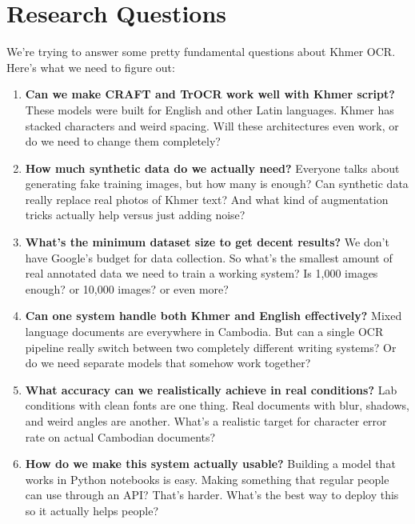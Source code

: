 \section{Research Questions}
\label{sec:questions}

We're trying to answer some pretty fundamental questions about Khmer OCR. Here's what we need to figure out:

\begin{enumerate}
    \item \textbf{Can we make CRAFT and TrOCR work well with Khmer script?} These models were built for English and other Latin languages. Khmer has stacked characters and weird spacing. Will these architectures even work, or do we need to change them completely?

    \item \textbf{How much synthetic data do we actually need?} Everyone talks about generating fake training images, but how many is enough? Can synthetic data really replace real photos of Khmer text? And what kind of augmentation tricks actually help versus just adding noise?

    \item \textbf{What's the minimum dataset size to get decent results?} We don't have Google's budget for data collection. So what's the smallest amount of real annotated data we need to train a working system? Is 1,000 images enough? or 10,000 images? or even more?

    \item \textbf{Can one system handle both Khmer and English effectively?} Mixed language documents are everywhere in Cambodia. But can a single OCR pipeline really switch between two completely different writing systems? Or do we need separate models that somehow work together?

    \item \textbf{What accuracy can we realistically achieve in real conditions?} Lab conditions with clean fonts are one thing. Real documents with blur, shadows, and weird angles are another. What's a realistic target for character error rate on actual Cambodian documents?

    \item \textbf{How do we make this system actually usable?} Building a model that works in Python notebooks is easy. Making something that regular people can use through an API? That's harder. What's the best way to deploy this so it actually helps people?
\end{enumerate}

